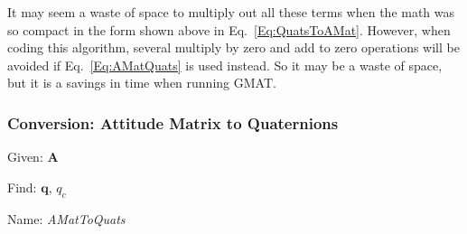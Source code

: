 It may seem a waste of space to multiply out all these terms when the math was
so compact in the form shown above in Eq.~\ref{Eq:QuatsToAMat}.  However, when
coding this algorithm, several multiply by zero and add to zero operations will
be avoided if Eq.~\ref{Eq:AMatQuats} is used instead.  So it may be a waste of
space, but it is a savings in time when running GMAT.



\subsubsection{Conversion:  Attitude Matrix to Quaternions} \label{sec:AMatToQuat}

Given:  $\mathbf{A}$

\noindent Find:  $\mathbf{q}$, $q_c$

\noindent Name:  \emph{AMatToQuats}

